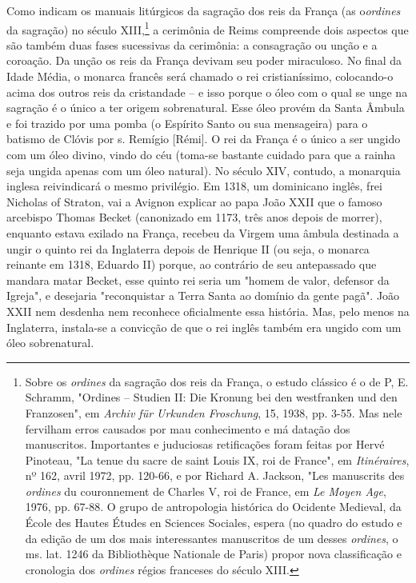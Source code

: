 \documentclass[a5paper]{book}
\begin{document}
Como indicam os manuais litúrgicos da sagração dos reis da França (as o\textit{ordines} da sagração) no século XIII,\footnote{Sobre os \textit{ordines} da sagração dos reis da França, o estudo clássico é o de P, E. Schramm, "Ordines -- Studien II: Die Kronung bei den westfranken und den Franzosen", em \textit{Archiv für Urkunden Froschung}, 15, 1938, pp. 3-55. Mas nele fervilham erros causados por mau conhecimento e má datação dos manuscritos. Importantes e juduciosas retificações foram feitas por Hervé Pinoteau, "La tenue du sacre de saint Louis IX, roi de France", em \textit{Itinéraires}, nº 162, avril 1972, pp. 120-66, e por Richard A. Jackson, "Les manuscrits des \textit{ordines} du couronnement de Charles V, roi de France, em \textit{Le Moyen Age}, 1976, pp. 67-88. O grupo de antropologia histórica do Ocidente Medieval, da École des Hautes Études en Sciences Sociales, espera (no quadro do estudo e da edição de um dos mais interessantes manuscritos de um desses \textit{ordines}, o ms. lat. 1246 da Bibliothèque Nationale de Paris) propor nova classificação e cronologia dos \textit{ordines} régios franceses do século XIII.} a cerimônia de Reims compreende dois aspectos que são também duas fases sucessivas da cerimônia: a consagração ou unção e a coroação. Da unção os reis da França devivam seu poder miraculoso. No final da Idade Média, o monarca francês será chamado o rei cristianíssimo, colocando-o acima dos outros reis da cristandade -- e isso porque o óleo com o qual se unge na sagração é o único a ter origem sobrenatural. Esse óleo provém da Santa Âmbula e foi trazido por uma pomba (o Espírito Santo ou sua mensageira) para o batismo de Clóvis por s. Remígio [Rémi]. O rei da França é o único a ser ungido com um óleo divino, vindo do céu (toma-se bastante cuidado para que a rainha seja ungida apenas com um óleo natural). No século XIV, contudo, a monarquia inglesa reivindicará o mesmo privilégio. Em 1318, um dominicano inglês, frei Nicholas of Straton, vai a Avignon explicar ao papa João XXII que o famoso arcebispo Thomas Becket (canonizado em 1173, três anos depois de morrer), enquanto estava exilado na França, recebeu da Virgem uma âmbula destinada a ungir o quinto rei da Inglaterra depois de Henrique II (ou seja, o monarca reinante em 1318, Eduardo II) porque, ao contrário de seu antepassado que mandara matar Becket, esse quinto rei seria um "homem de valor, defensor da Igreja", e desejaria "reconquistar a Terra Santa ao domínio da gente pagã". João XXII nem desdenha nem reconhece oficialmente essa história. Mas, pelo menos na Inglaterra, instala-se a convicção de que o rei inglês também era ungido com um óleo sobrenatural.
\end{document}
